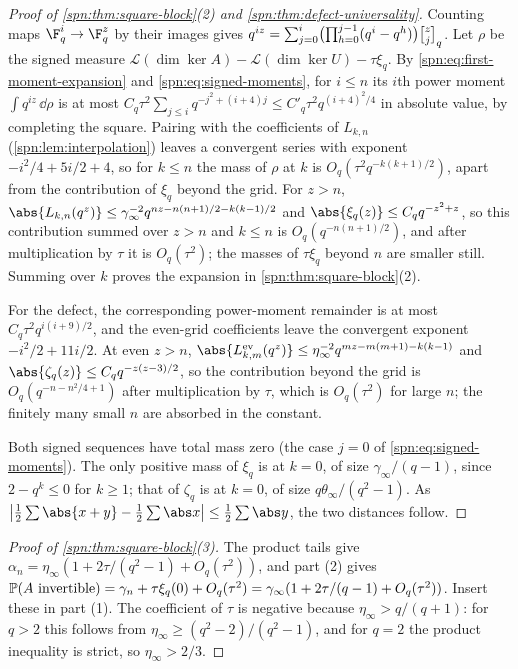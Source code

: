 \begin{proof}[Proof of \cref{spn:thm:square-block}(2) and \cref{spn:thm:defect-universality}]
Counting maps $\F_q^i\to\F_q^z$ by their images gives
$q^{iz}=\sum_{j=0}^i\bigl(\prod_{h=0}^{j-1}(q^i-q^h)\bigr)\spnqbin zjq$. Let $\rho$ be the signed
measure $\mathcal L(\dim\ker A)-\mathcal L(\dim\ker U)-\tau\xi_q$. By
\eqref{spn:eq:first-moment-expansion} and \eqref{spn:eq:signed-moments}, for $i\le n$ its $i$th
power moment $\int q^{iz}\,\dd\rho$ is at most
$C_q\tau^2\sum_{j\le i}q^{-j^2+(i+4)j}\le C'_q\tau^2q^{(i+4)^2/4}$ in absolute value, by completing
the square. Pairing with the coefficients of $L_{k,n}$ (\cref{spn:lem:interpolation}) leaves a
convergent series with exponent $-i^2/4+5i/2+4$, so for $k\le n$ the mass of $\rho$ at $k$ is
$O_q(\tau^2q^{-k(k+1)/2})$, apart from the contribution of $\xi_q$ beyond the grid. For $z>n$,
$\abs{L_{k,n}(q^z)}\le\gamma_\infty^{-2}q^{nz-n(n+1)/2-k(k-1)/2}$ and
$\abs{\xi_q(z)}\le C_qq^{-z^2+z}$, so this contribution summed over $z>n$ and $k\le n$ is
$O_q(q^{-n(n+1)/2})$, and after multiplication by $\tau$ it is $O_q(\tau^2)$; the masses of
$\tau\xi_q$ beyond $n$ are smaller still. Summing over $k$ proves the expansion in
\cref{spn:thm:square-block}(2).

For the defect, the corresponding power-moment remainder is at most $C_q\tau^2q^{i(i+9)/2}$, and
the even-grid coefficients leave the convergent exponent $-i^2/2+11i/2$. At even $z>n$,
$\abs{L^{\mathrm{ev}}_{k,m}(q^z)}\le\eta_\infty^{-2}q^{mz-m(m+1)-k(k-1)}$ and
$\abs{\zeta_q(z)}\le C_qq^{-z(z-3)/2}$, so the contribution beyond the grid is
$O_q(q^{-n-n^2/4+1})$ after multiplication by $\tau$, which is $O_q(\tau^2)$ for large $n$; the
finitely many small $n$ are absorbed in the constant.

Both signed sequences have total mass zero (the case $j=0$ of \eqref{spn:eq:signed-moments}). The
only positive mass of $\xi_q$ is at $k=0$, of size $\gamma_\infty/(q-1)$, since $2-q^k\le0$ for
$k\ge1$; that of $\zeta_q$ is at $k=0$, of size $q\theta_\infty/(q^2-1)$. As
$\bigl|\frac12\sum\abs{x+y}-\frac12\sum\abs x\bigr|\le\frac12\sum\abs y$, the two distances
follow.
\end{proof}

\begin{proof}[Proof of \cref{spn:thm:square-block}(3)]
The product tails give $\alpha_n=\eta_\infty(1+2\tau/(q^2-1)+O_q(\tau^2))$, and part (2) gives
$\mathbb{P}(A\text{ invertible})=\gamma_n+\tau\xi_q(0)+O_q(\tau^2)
=\gamma_\infty(1+2\tau/(q-1)+O_q(\tau^2))$. Insert these in part (1). The coefficient of $\tau$
is negative because $\eta_\infty>q/(q+1)$: for $q>2$ this follows from
$\eta_\infty\ge(q^2-2)/(q^2-1)$, and for $q=2$ the product inequality is strict, so
$\eta_\infty>2/3$.
\end{proof}

